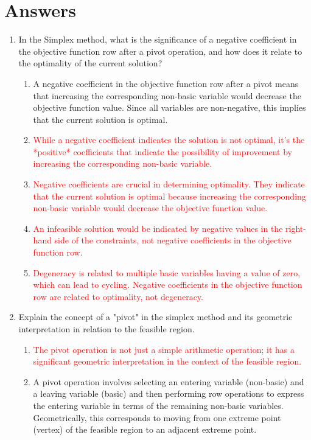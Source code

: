\documentclass{article}%
\newcommand{\incorrect}[1]{\textcolor{red}{#1}}
\begin{document}
\section{Answers}%
\label{sec:Answers}%
\begin{enumerate}%
\item In the Simplex method, what is the significance of a negative coefficient in the objective function row after a pivot operation, and how does it relate to the optimality of the current solution?%
\begin{enumerate}%
\item A negative coefficient in the objective function row after a pivot means that increasing the corresponding non-basic variable would decrease the objective function value. Since all variables are non-negative, this implies that the current solution is optimal.%
\item \incorrect{While a negative coefficient indicates the solution is not optimal, it's the *positive* coefficients that indicate the possibility of improvement by increasing the corresponding non-basic variable.}%
\item \incorrect{Negative coefficients are crucial in determining optimality. They indicate that the current solution is optimal because increasing the corresponding non-basic variable would decrease the objective function value.}%
\item \incorrect{An infeasible solution would be indicated by negative values in the right-hand side of the constraints, not negative coefficients in the objective function row.}%
\item \incorrect{Degeneracy is related to multiple basic variables having a value of zero, which can lead to cycling. Negative coefficients in the objective function row are related to optimality, not degeneracy.}%
\end{enumerate}%
\vspace{1em}%
\item Explain the concept of a "pivot" in the simplex method and its geometric interpretation in relation to the feasible region.%
\begin{enumerate}%
\item \incorrect{The pivot operation is not just a simple arithmetic operation; it has a significant geometric interpretation in the context of the feasible region.}%
\item A pivot operation involves selecting an entering variable (non-basic) and a leaving variable (basic) and then performing row operations to express the entering variable in terms of the remaining non-basic variables. Geometrically, this corresponds to moving from one extreme point (vertex) of the feasible region to an adjacent extreme point.%

\end{enumerate}
\end{enumerate}
\end{document}

